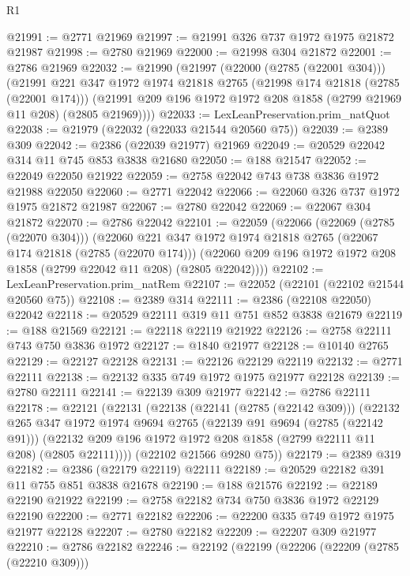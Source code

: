 \begin{lexlean}{R1}
\begin{coremodule}
@21991 := @2771 @21969
@21997 := @21991 @326 @737 @1972 @1975 @21872 @21987
@21998 := @2780 @21969
@22000 := @21998 @304 @21872
@22001 := @2786 @21969
@22032 := @21990
    (@21997
      (@22000 (@2785 (@22001 @304)))
      (@21991
        @221
        @347
        @1972
        @1974
        @21818
        @2765
        (@21998 @174 @21818 (@2785 (@22001 @174)))
        (@21991 @209 @196 @1972 @1972 @208 @1858 (@2799 @21969 @11 @208) (@2805 @21969))))
@22033 := LexLeanPreservation.prim_natQuot
@22038 := @21979 (@22032 (@22033 @21544 @20560 @75))
@22039 := @2389 @309
@22042 := @2386 (@22039 @21977) @21969
@22049 := @20529 @22042 @314 @11 @745 @853 @3838 @21680
@22050 := @188 @21547
@22052 := @22049 @22050 @21922
@22059 := @2758 @22042 @743 @738 @3836 @1972 @21988 @22050
@22060 := @2771 @22042
@22066 := @22060 @326 @737 @1972 @1975 @21872 @21987
@22067 := @2780 @22042
@22069 := @22067 @304 @21872
@22070 := @2786 @22042
@22101 := @22059
    (@22066
      (@22069 (@2785 (@22070 @304)))
      (@22060
        @221
        @347
        @1972
        @1974
        @21818
        @2765
        (@22067 @174 @21818 (@2785 (@22070 @174)))
        (@22060 @209 @196 @1972 @1972 @208 @1858 (@2799 @22042 @11 @208) (@2805 @22042))))
@22102 := LexLeanPreservation.prim_natRem
@22107 := @22052 (@22101 (@22102 @21544 @20560 @75))
@22108 := @2389 @314
@22111 := @2386 (@22108 @22050) @22042
@22118 := @20529 @22111 @319 @11 @751 @852 @3838 @21679
@22119 := @188 @21569
@22121 := @22118 @22119 @21922
@22126 := @2758 @22111 @743 @750 @3836 @1972
@22127 := @1840 @21977
@22128 := @10140 @2765
@22129 := @22127 @22128
@22131 := @22126 @22129 @22119
@22132 := @2771 @22111
@22138 := @22132 @335 @749 @1972 @1975 @21977 @22128
@22139 := @2780 @22111
@22141 := @22139 @309 @21977
@22142 := @2786 @22111
@22178 := @22121
    (@22131
      (@22138
        (@22141 (@2785 (@22142 @309)))
        (@22132
          @265
          @347
          @1972
          @1974
          @9694
          @2765
          (@22139 @91 @9694 (@2785 (@22142 @91)))
          (@22132 @209 @196 @1972 @1972 @208 @1858 (@2799 @22111 @11 @208) (@2805 @22111))))
      (@22102 @21566 @9280 @75))
@22179 := @2389 @319
@22182 := @2386 (@22179 @22119) @22111
@22189 := @20529 @22182 @391 @11 @755 @851 @3838 @21678
@22190 := @188 @21576
@22192 := @22189 @22190 @21922
@22199 := @2758 @22182 @734 @750 @3836 @1972 @22129 @22190
@22200 := @2771 @22182
@22206 := @22200 @335 @749 @1972 @1975 @21977 @22128
@22207 := @2780 @22182
@22209 := @22207 @309 @21977
@22210 := @2786 @22182
@22246 := @22192
    (@22199
      (@22206
        (@22209 (@2785 (@22210 @309)))

\end{coremodule}
\end{lexlean}
